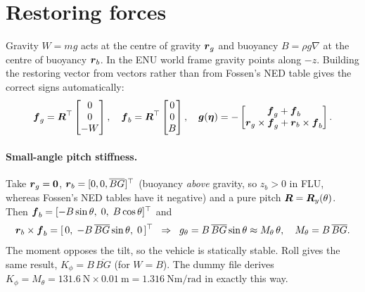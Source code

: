 \section{Restoring forces}
\label{sec:restoring}

Gravity $W = mg$ acts at the centre of gravity $\boldsymbol{r}_g$ and buoyancy
$B = \rho g\nabla$ at the centre of buoyancy $\boldsymbol{r}_b$. In the ENU world frame gravity
points along $-z$. Building the restoring vector from vectors rather than from Fossen's NED
table gives the correct signs automatically:
\begin{equation}
  \boldsymbol{f}_g = \boldsymbol{R}^\top\begin{bmatrix}0\\0\\-W\end{bmatrix}, \quad
  \boldsymbol{f}_b = \boldsymbol{R}^\top\begin{bmatrix}0\\0\\B\end{bmatrix}, \quad
  \boldsymbol{g}(\boldsymbol{\eta}) = -\begin{bmatrix} \boldsymbol{f}_g + \boldsymbol{f}_b \\
     \boldsymbol{r}_g\times\boldsymbol{f}_g + \boldsymbol{r}_b\times\boldsymbol{f}_b \end{bmatrix}.
  \label{eq:restoring}
\end{equation}

\paragraph{Small-angle pitch stiffness.} Take $\boldsymbol{r}_g = \boldsymbol{0}$,
$\boldsymbol{r}_b = [0, 0, \overline{BG}]^\top$ (buoyancy \emph{above} gravity, so $z_b > 0$ in FLU,
whereas Fossen's NED tables have it negative) and a pure pitch $\boldsymbol{R} = \boldsymbol{R}_y(\theta)$.
Then $\boldsymbol{f}_b = [-B\sin\theta,\;0,\;B\cos\theta]^\top$ and
\begin{equation}
  \boldsymbol{r}_b\times\boldsymbol{f}_b = [\,0,\; -B\,\overline{BG}\sin\theta,\; 0\,]^\top
  \;\;\Rightarrow\;\;
  g_\theta = B\,\overline{BG}\sin\theta \approx M_\theta\,\theta,
  \quad M_\theta = B\,\overline{BG}.
  \label{eq:pitch-stiffness}
\end{equation}
The moment opposes the tilt, so the vehicle is statically stable. Roll gives the same result,
$K_\phi = B\,\overline{BG}$ (for $W = B$). The dummy file derives $K_\phi = M_\theta =
\qty{131.6}{\newton}\times\qty{0.01}{\meter} = \qty{1.316}{\newton\meter\per\radian}$ in
exactly this way.

